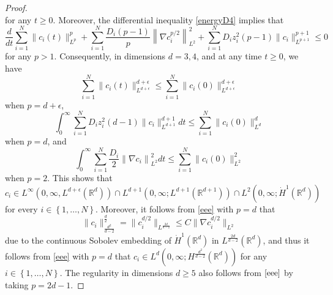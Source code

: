 \documentclass[11pt,reqno]{amsart}
\newcommand{\na}{\nabla}
\newcommand{\be}{\begin{equation}}
\newcommand{\ee}{\end{equation}}
\newcommand{\R}{\mathbb R}
\begin{document}
\begin{proof}
\begin{equation}
\end{equation} for any $t \ge 0$. 
Moreover, the differential inequality \eqref{energyD4} implies that 
\begin{equation} \label{eee}
\frac{d}{dt} \sum_{i=1}^{N} \|c_i(t)\|_{L^{p}}^{p} + \sum\limits_{i=1}^{N} \frac{D_i(p-1)}{p} \left\| \nabla c_i^{p/2} \right\|_{L^2}^2 + \sum\limits_{i=1}^{N} {D_i z_i^2(p-1)}\|c_i\|_{L^{p+1}}^{p+1}  \leq 0
\end{equation}  for any $p > 1$. 
Consequently, in dimensions $d= 3,4$, and at any time $t \ge 0$, we have 
\be 
\sum_{i=1}^{N} \|c_i(t)\|_{L^{d+\epsilon}}^{d+\epsilon} 
\le \sum_{i=1}^{N} \|c_i(0)\|_{L^{d+\epsilon}}^{d+\epsilon} 
\ee when $p = d + \epsilon$, 
\be 
\int_{0}^{\infty} \sum\limits_{i=1}^{N} {D_i z_i^2(d-1)}\|c_i\|_{L^{d+1}}^{d+1} dt \le \sum_{i=1}^{N} \|c_i(0)\|_{L^{d}}^{d}
\ee when $p = d$, and 
\be 
\int_{0}^{\infty} \sum\limits_{i=1}^{N} \frac{D_i}{2} \left\| \nabla c_i \right\|_{L^2}^2  dt \le \sum_{i=1}^{N} \|c_i(0)\|_{L^{2}}^{2} 
\ee when $p =2$. 
This shows that $c_i \in L^{\infty}(0,\infty, L^{d+\epsilon}(\R^d)) \cap L^{d+1}(0, \infty; L^{d+1}(\R^{d+1})) \cap L^2(0,\infty; \dot{H}^1(\R^d))$ for every $i \in \left\{1, \dots, N \right\}$. Moreover, it follows from \eqref{eee} with $p=d$ that 
\be 
\|c_i\|_{\frac{d^2}{d-2}}^{\frac{d}{2}}= \|c_i^{d/2}\|_{L^{\frac{2d}{d-2}}} \le C\|\na c_i^{d/2}\|_{L^2}
\ee due to the continuous Sobolev embedding of $\dot{H}^{1}(\R^d)$ in $L^{\frac{2d}{d-2}}(\R^d)$, and thus it follows from \eqref{eee} with $p=d$ that $c_i \in L^{d}(0, \infty; H^{\frac{d^2}{d-2}}(\R^d))$ for any $i \in \left\{1, \dots, N\right\}$. The regularity in dimensions $d  \ge 5$ also follows from $\eqref{eee}$ by taking $p = 2d-1$.  



\end{proof}
\end{document}
